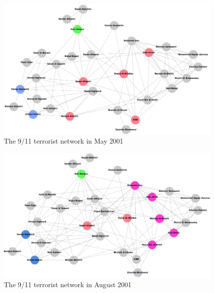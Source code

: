 \begin{subappendices}
\begin{figure}[h]
\label{Terrorist-May01}
\begin{center}
\includegraphics[scale=0.4]{imgs/T2001-05.png}
\end{center}
\caption{The 9/11 terrorist network in May 2001}
\end{figure}

\begin{figure}[h]
\label{Terrorist-Aug01}
\begin{center}
\includegraphics[scale=0.4]{imgs/T2001-08.png}
\end{center}
\caption{The 9/11 terrorist network in August 2001}
\end{figure}

\newpage


\end{subappendices}
